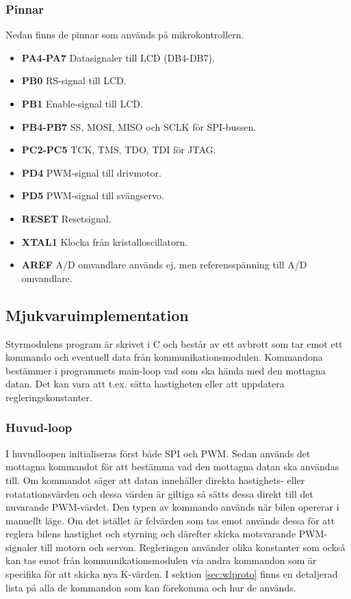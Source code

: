 \documentclass[tekniskrapport/tech.tex]{subfiles}
\begin{document}
\subsubsection{Pinnar}
Nedan finns de pinnar som används på mikrokontrollern.
\begin{itemize}
   \item \textbf{PA4-PA7} Datasignaler till LCD (DB4-DB7).
   \item \textbf{PB0} RS-signal till LCD.
   \item \textbf{PB1} Enable-signal till LCD.
   \item \textbf{PB4-PB7} SS, MOSI, MISO och SCLK för SPI-bussen.
   \item \textbf{PC2-PC5} TCK, TMS, TDO, TDI för JTAG.
   \item \textbf{PD4} PWM-signal till drivmotor.
   \item \textbf{PD5} PWM-signal till svängservo.
   \item \textbf{RESET} Resetsignal.
   \item \textbf{XTAL1} Klocka från kristalloscillatorn.
   \item \textbf{AREF} A/D omvandlare används ej, men referensspänning till A/D omvandlare.
\end{itemize}

\subsection{Mjukvaruimplementation}
Styrmodulens program  är skrivet i C och består av ett avbrott som tar emot ett
kommando och eventuell data från kommunikationsmodulen. Kommandona bestämmer i
programmets main-loop vad som ska hända med den mottagna datan. Det kan vara
att t.ex. sätta hastigheten eller att uppdatera regleringskonstanter. 

\subsubsection{Huvud-loop}
I huvudloopen initialiseras först både SPI och PWM. Sedan används det mottagna
kommandot för att bestämma vad den mottagna datan ska användas till. Om
kommandot säger att datan innehåller direkta hastighets- eller
rotatationsvärden och dessa värden är giltiga så sätts dessa direkt till det
nuvarande PWM-värdet. Den typen av kommando används när bilen opererar i
manuellt läge. Om det istället är felvärden som tas emot används dessa för att
reglera bilens hastighet och styrning och därefter skicka motsvarande
PWM-signaler till motorn och servon. Regleringen använder olika konstanter som
också kan tas emot från kommunikationsmodulen via andra kommandon som är
specifika för att skicka nya K-värden. I sektion \ref{sec:wlproto} finns en
detaljerad lista på alla de kommandon som kan förekomma och hur de används.
\end{document}
